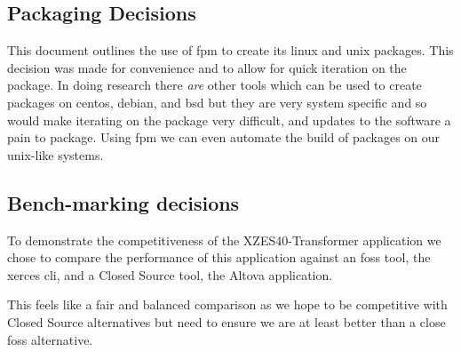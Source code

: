 \subsection{Packaging Decisions}

This document outlines the use of \gls{fpm} to create its \gls{linux} and \gls{unix} packages.
This decision was made for convenience and to allow for quick iteration on the package.
In doing research there \textit{are} other tools which can be used to create packages on \gls{centos}, \gls{debian}, and \gls{bsd} but they are very system specific and so would make iterating on the package very difficult, and updates to the software a pain to package.
Using \gls{fpm} we can even automate the build of packages on our \gls{unix}-like systems.

\subsection{Bench-marking decisions}

To demonstrate the competitiveness of the XZES40-Transformer application we chose to compare the performance of this application against an \gls{foss} tool, the \gls{xerces} \gls{cli}, and a Closed Source tool, the Altova application.

This feels like a fair and balanced comparison as we hope to be competitive with Closed Source alternatives but need to ensure we are at least better than a close \gls{foss} alternative.
